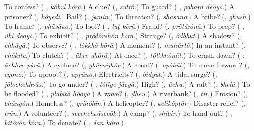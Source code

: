 \begin{tcolorbox}[breakable,colback=teal!4,colframe=teal!35!black,title={Before you move on}]
To confess? (\textbf{ }, \emph{kôbul kôrā}.) A clue? (\textbf{}, \emph{sūtrô}.) To guard? (\textbf{ }, \emph{pāhārā deoyā}.) A prisoner? (\textbf{}, \emph{kôyedi}.) Bail? (\textbf{}, \emph{jāmin}.) To threaten? (\textbf{}, \emph{shāsāno}.) A bribe? (\textbf{}, \emph{ghush}.) To frame? (\textbf{}, \emph{phā̃sāno}.) To loot? (\textbf{ }, \emph{luṭ kôrā}.) Fraud? (\textbf{}, \emph{prôtārônā}.) To peep? (\textbf{ }, \emph{ũki deoyā}.) To exhibit? (\textbf{ }, \emph{prôdôrshôn kôrā}.) Strange? (\textbf{}, \emph{ôdbhut}.) A shadow? (\textbf{}, \emph{chhāyā}.) To observe? (\textbf{ }, \emph{lôkkhô kôrā}.) A moment? (\textbf{}, \emph{muhūrtô}.) In an instant? (\textbf{}, \emph{chôkite}.) To clutch? (\textbf{ }, \emph{ā̃kṛe dhôrā}.) At once? (\textbf{}, \emph{tôtkkhônāt}.) To crash down? (\textbf{ }, \emph{āchhṛe pôṛā}.) A cyclone? (\textbf{}, \emph{ghūrnijhôṛ}.) A coast? (\textbf{}, \emph{upôkūl}.) To move forward? (\textbf{}, \emph{egono}.) To uproot? (\textbf{}, \emph{upṛāno}.) Electricity? (\textbf{}, \emph{bidyut}.) A tidal surge? (\textbf{}, \emph{jôlochchhvās}.) To go under? (\textbf{ }, \emph{tôliye jāoyā}.) High? (\textbf{}, \emph{ũchu}.) A raft? (\textbf{}, \emph{bhelā}.) To be flooded? (\textbf{ }, \emph{plābitô hôoyā}.) A wave? (\textbf{}, \emph{ḍheu}.) A riverbank? (\textbf{}, \emph{tīr}.) Erosion? (\textbf{}, \emph{bhāngôn}.) Homeless? (\textbf{}, \emph{grihôhīn}.) A helicopter? (\textbf{}, \emph{helikôpṭār}.) Disaster relief? (\textbf{}, \emph{trān}.) A volunteer? (\textbf{}, \emph{svechchhāsebôk}.) A camp? (\textbf{}, \emph{shibir}.) To hand out? (\textbf{ }, \emph{bitôrôn kôrā}.) To donate? (\textbf{ }, \emph{dān kôrā}.)
\end{tcolorbox}
